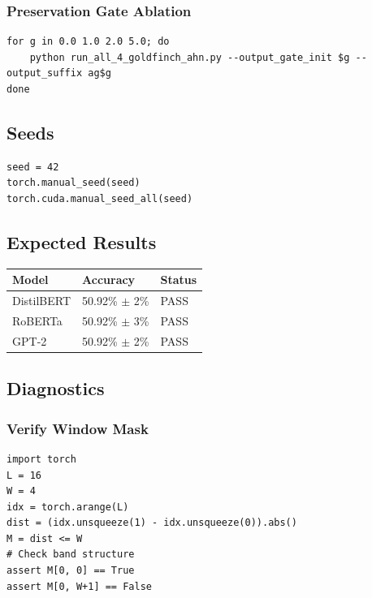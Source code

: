 \subsubsection{Preservation Gate Ablation}

\begin{lstlisting}
for g in 0.0 1.0 2.0 5.0; do
    python run_all_4_goldfinch_ahn.py --output_gate_init $g --output_suffix ag$g
done
\end{lstlisting}

\subsection{Seeds}

\begin{lstlisting}
seed = 42
torch.manual_seed(seed)
torch.cuda.manual_seed_all(seed)
\end{lstlisting}

\subsection{Expected Results}

\begin{table}[H]
\centering
\small
\begin{tabular}{lll}
\toprule
\textbf{Model} & \textbf{Accuracy} & \textbf{Status} \\
\midrule
DistilBERT & 50.92\% $\pm$ 2\% & PASS \\
RoBERTa & 50.92\% $\pm$ 3\% & PASS \\
GPT-2 & 50.92\% $\pm$ 2\% & PASS \\
\bottomrule
\end{tabular}
\end{table}

\subsection{Diagnostics}

\subsubsection{Verify Window Mask}

\begin{lstlisting}
import torch
L = 16
W = 4
idx = torch.arange(L)
dist = (idx.unsqueeze(1) - idx.unsqueeze(0)).abs()
M = dist <= W
# Check band structure
assert M[0, 0] == True
assert M[0, W+1] == False
\end{lstlisting}

